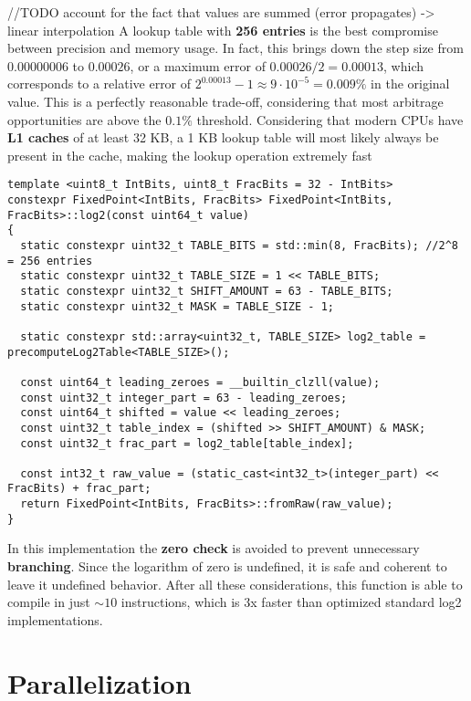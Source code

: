 \documentclass[11pt]{article}
\begin{document}
//TODO account for the fact that values are summed (error propagates) -> linear interpolation
A lookup table with \textbf{256 entries} is the best compromise between precision and memory usage. In fact, this brings down the step size from $0.00000006$ to $0.00026$, or a maximum error of $0.00026 / 2 = 0.00013$, which corresponds to a relative error of $2^{0.00013} - 1 \approx 9 \cdot 10^{-5} = 0.009\%$ in the original value. This is a perfectly reasonable trade-off, considering that most arbitrage opportunities are above the $0.1\%$ threshold. Considering that modern CPUs have \textbf{L1 caches} of at least 32 KB, a 1 KB lookup table will most likely always be present in the cache, making the lookup operation extremely fast

\newpage
\begin{verbatim}
template <uint8_t IntBits, uint8_t FracBits = 32 - IntBits>
constexpr FixedPoint<IntBits, FracBits> FixedPoint<IntBits, FracBits>::log2(const uint64_t value)
{
  static constexpr uint32_t TABLE_BITS = std::min(8, FracBits); //2^8 = 256 entries
  static constexpr uint32_t TABLE_SIZE = 1 << TABLE_BITS;
  static constexpr uint32_t SHIFT_AMOUNT = 63 - TABLE_BITS;
  static constexpr uint32_t MASK = TABLE_SIZE - 1;

  static constexpr std::array<uint32_t, TABLE_SIZE> log2_table = precomputeLog2Table<TABLE_SIZE>();

  const uint64_t leading_zeroes = __builtin_clzll(value);
  const uint32_t integer_part = 63 - leading_zeroes;
  const uint64_t shifted = value << leading_zeroes;
  const uint32_t table_index = (shifted >> SHIFT_AMOUNT) & MASK;
  const uint32_t frac_part = log2_table[table_index];

  const int32_t raw_value = (static_cast<int32_t>(integer_part) << FracBits) + frac_part;
  return FixedPoint<IntBits, FracBits>::fromRaw(raw_value);
}
\end{verbatim}
In this implementation the \textbf{zero check} is avoided to prevent unnecessary \textbf{branching}. Since the logarithm of zero is undefined, it is safe and coherent to leave it undefined behavior. After all these considerations, this function is able to compile in just $\sim{10}$ instructions, which is 3x faster than optimized standard log2 implementations\textsuperscript{\cite{libc_log2}}.

\section{Parallelization}
\end{document}

